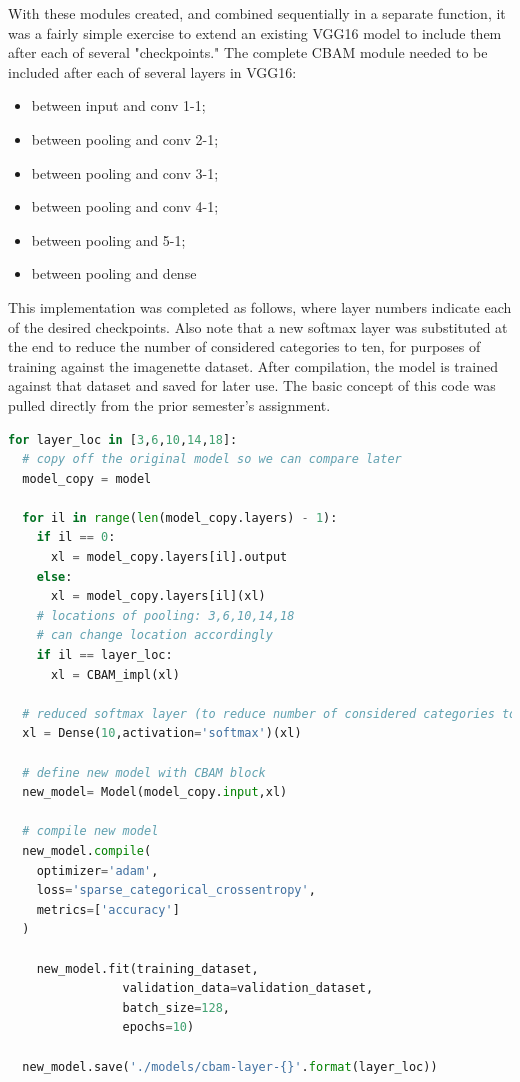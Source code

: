\documentclass{article}
\begin{document}
With these modules created, and combined sequentially in a separate function, it was a fairly simple exercise to extend an existing VGG16 model to include them after each of several "checkpoints."
The complete CBAM module needed to be included after each of several layers in VGG16:
\begin{itemize}
    \item between input and conv 1-1;
    \item between pooling and conv 2-1; 
    \item between pooling and conv 3-1;  
    \item between pooling and conv 4-1;  
    \item between pooling and 5-1; 
    \item between pooling and dense
\end{itemize}

This implementation was completed as follows, where layer numbers indicate each of the desired checkpoints.
Also note that a new softmax layer was substituted at the end to reduce the number of considered categories to ten, for purposes of training against the imagenette dataset.
After compilation, the model is trained against that dataset and saved for later use.
The basic concept of this code was pulled directly from the prior semester's assignment.

\begin{lstlisting}[language=Python]
for layer_loc in [3,6,10,14,18]:
  # copy off the original model so we can compare later
  model_copy = model

  for il in range(len(model_copy.layers) - 1):
    if il == 0:
      xl = model_copy.layers[il].output
    else:
      xl = model_copy.layers[il](xl)
    # locations of pooling: 3,6,10,14,18
    # can change location accordingly
    if il == layer_loc:
      xl = CBAM_impl(xl)

  # reduced softmax layer (to reduce number of considered categories to 10)
  xl = Dense(10,activation='softmax')(xl)

  # define new model with CBAM block
  new_model= Model(model_copy.input,xl)

  # compile new model
  new_model.compile(
    optimizer='adam',
    loss='sparse_categorical_crossentropy',
    metrics=['accuracy']
  )
  
    new_model.fit(training_dataset,
                validation_data=validation_dataset,
                batch_size=128,
                epochs=10)
  
  new_model.save('./models/cbam-layer-{}'.format(layer_loc))
\end{lstlisting}
\end{document}
